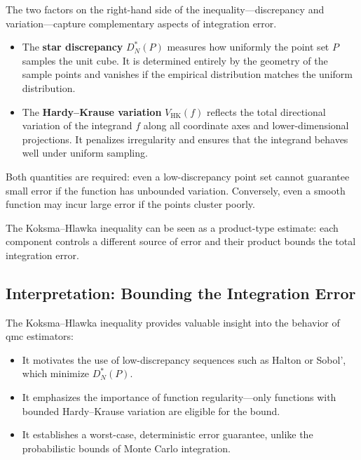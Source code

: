The two factors on the right-hand side of the inequality—discrepancy and
variation—capture complementary aspects of integration error.

\begin{itemize}
    \item The \textbf{star discrepancy} $D_N^*(P)$ measures how uniformly the
    point set $P$ samples the unit cube. It is determined entirely by the
    geometry of the sample points and vanishes if the empirical distribution
    matches the uniform distribution.
    \item The \textbf{Hardy--Krause variation} $V_{\mathrm{HK}}(f)$ reflects the
    total directional variation of the integrand $f$ along all coordinate axes
    and lower-dimensional projections. It penalizes irregularity and ensures
    that the integrand behaves well under uniform sampling.
\end{itemize}

Both quantities are required: even a low-discrepancy point set cannot guarantee
small error if the function has unbounded variation. Conversely, even a smooth
function may incur large error if the points cluster poorly.

\begin{remark}
The Koksma--Hlawka inequality can be seen as a product-type estimate: each
component controls a different source of error and their product bounds the
total integration error.
\end{remark}


\subsection{Interpretation: Bounding the Integration Error}

The Koksma--Hlawka inequality provides valuable insight into the behavior of
\acl{qmc} estimators:

\begin{itemize}
    \item It motivates the use of low-discrepancy sequences such as Halton or
    Sobol', which minimize $D_N^*(P)$.
    \item It emphasizes the importance of function regularity—only functions
    with bounded Hardy--Krause variation are eligible for the bound.
    \item It establishes a worst-case, deterministic error guarantee, unlike the
    probabilistic bounds of Monte Carlo integration.
\end{itemize}


